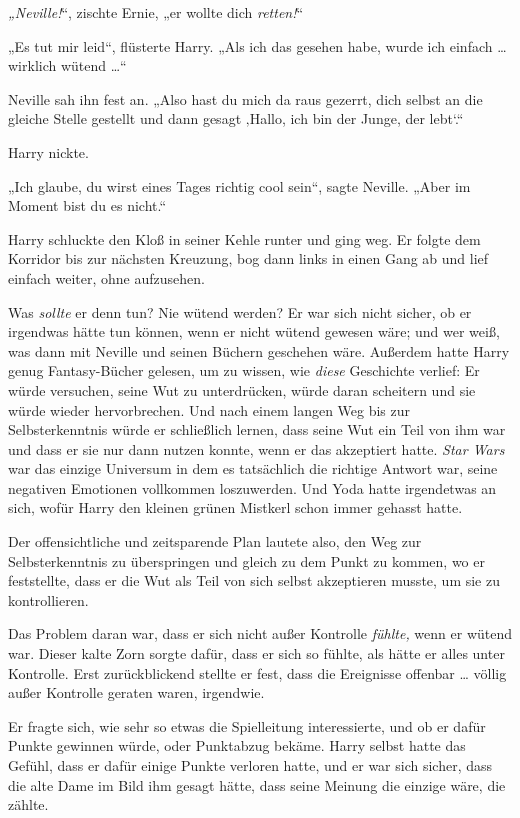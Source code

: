 {\emph{„Neville!}“, zischte Ernie, „er wollte dich \emph{retten!}“

„Es tut mir leid“, flüsterte Harry. „Als ich das gesehen habe, wurde ich einfach … wirklich wütend …“

Neville sah ihn fest an. „Also hast du mich da raus gezerrt, dich selbst an die gleiche Stelle gestellt und dann gesagt ‚Hallo, ich bin der Junge, der lebt`.“

Harry nickte.

„Ich glaube, du wirst eines Tages richtig cool sein“, sagte Neville. „Aber im Moment bist du es nicht.“

Harry schluckte den Kloß in seiner Kehle runter und ging weg. Er folgte dem Korridor bis zur nächsten Kreuzung, bog dann links in einen Gang ab und lief einfach weiter, ohne aufzusehen.

Was \emph{sollte} er denn tun? Nie wütend werden? Er war sich nicht sicher, ob er irgendwas hätte tun können, wenn er nicht wütend gewesen wäre; und wer weiß, was dann mit Neville und seinen Büchern geschehen wäre. Außerdem hatte Harry genug Fantasy-Bücher gelesen, um zu wissen, wie \emph{diese} Geschichte verlief: Er würde versuchen, seine Wut zu unterdrücken, würde daran scheitern und sie würde wieder hervorbrechen. Und nach einem langen Weg bis zur Selbsterkenntnis würde er schließlich lernen, dass seine Wut ein Teil von ihm war und dass er sie nur dann nutzen konnte, wenn er das akzeptiert hatte. \emph{Star Wars} war das einzige Universum in dem es tatsächlich die richtige Antwort war, seine negativen Emotionen vollkommen loszuwerden. Und Yoda hatte irgendetwas an sich, wofür Harry den kleinen grünen Mistkerl schon immer gehasst hatte.

Der offensichtliche und zeitsparende Plan lautete also, den Weg zur Selbsterkenntnis zu überspringen und gleich zu dem Punkt zu kommen, wo er feststellte, dass er die Wut als Teil von sich selbst akzeptieren musste, um sie zu kontrollieren.

Das Problem daran war, dass er sich nicht außer Kontrolle \emph{fühlte,} wenn er wütend war. Dieser kalte Zorn sorgte dafür, dass er sich so fühlte, als hätte er alles unter Kontrolle. Erst zurückblickend stellte er fest, dass die Ereignisse offenbar … völlig außer Kontrolle geraten waren, irgendwie.

Er fragte sich, wie sehr so etwas die Spielleitung interessierte, und ob er dafür Punkte gewinnen würde, oder Punktabzug bekäme. Harry selbst hatte das Gefühl, dass er dafür einige Punkte verloren hatte, und er war sich sicher, dass die alte Dame im Bild ihm gesagt hätte, dass seine Meinung die einzige wäre, die zählte.

}

